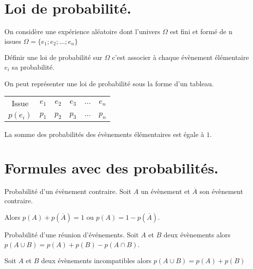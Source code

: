 \begin{pageCours} %


\section{Loi de probabilité.}

\begin{Def}
On considère une expérience aléatoire dont l'univers $\Omega$ est fini et formé de n issues $\Omega=\{e_1;e_2;\ldots;e_n\}$

Définir une loi de probabilité sur $\Omega$
c'est associer à chaque évènement élémentaire $e_i$ sa probabilité. 

On peut représenter une loi de probabilité
sous la forme d'un tableau.

\begin{tabular}{c|c|c|c|c|c}
Issue & $e_1$ & $e_2$ & $e_3$ & $\ldots$ & $e_n$ \\
$p(e_i)$ & $p_1$ & $p_2$ & $p_3$ & $\ldots$ & $p_n$
\end{tabular}
\end{Def}

\begin{Pp}
La somme des probabilités des évènements élémentaires est égale à $1$.
\end{Pp}

\section{Formules avec des probabilités.}

\begin{PpT}{Probabilité d'un évènement contraire.}
Soit $A$ un évènement et $\overline{A}$ son évènement contraire.

Alors $p(A)+p(\overline{A})=1$ ou $p(A)=1-p(\overline{A})$.
\end{PpT}

\begin{PpT}{Probabilité d'une réunion d'événements.}
Soit $A$ et $B$ deux évènements alors $p(A\cup B)=p(A)+p(B)-p(A\cap B)$.
\end{PpT}

\begin{Pp}
Soit $A$ et $B$ deux évènements incompatibles alors $p(A\cup B)=p(A)+p(B)$ 
\end{Pp}

\end{pageCours} %


